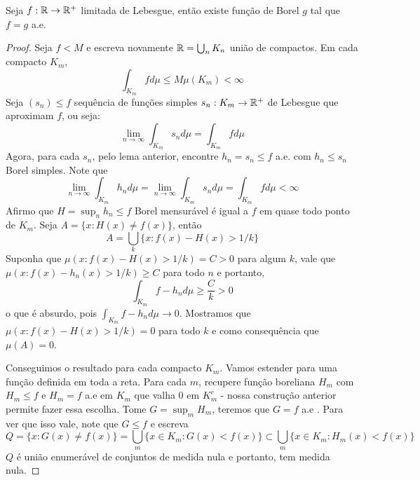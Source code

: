 \begin{lemma}
    Seja $f : \mathbb{R} \rightarrow \mathbb{R}^+$ limitada de Lebesgue, então existe função de Borel $g$ tal que 
    $f = g$ a.e.
\end{lemma}
\begin{proof}
    Seja $f < M$ e escreva novamente $\mathbb{R} = \bigcup_n K_n$ união de compactos. Em cada compacto $K_m$,
    $$\int_{K_m} fd\mu \leq M\mu(K_m) < \infty$$
    Seja $(s_n) \leq f$ sequência de funções simples $s_n : K_m \rightarrow \mathbb{R}^+$ de Lebesgue que aproximam $f$, ou seja:
    $$\lim_{n\to\infty} \int_{K_m} s_n d\mu = \int_{K_m} f d\mu$$
    Agora, para cada $s_n$, pelo lema anterior, encontre $h_n = s_n \leq f$ a.e. com $h_n \leq s_n$ Borel simples. Note que
    $$\lim_{n\to\infty}\int_{K_m} h_n d\mu = \lim_{n\to\infty} \int_{K_m} s_n d\mu = \int_{K_m} fd\mu < \infty$$
    Afirmo que $H = \sup_n h_n \leq f$ Borel mensurável é igual a $f$ em quase todo ponto de $K_m$. Seja $A = \{x : H(x) \neq f(x)\}$, então
    $$A = \bigcup_k \{x: f(x) - H(x) > 1/k\}$$
    Suponha que $\mu(x : f(x) - H(x) > 1/k) = C > 0$ para algum $k$, vale que $\mu(x: f(x) - h_n(x) > 1/k) \geq C $ para todo $n$ e 
    portanto,
    $$\int_{K_m} f - h_n d\mu \geq \frac{C}{k} > 0$$
    o que é absurdo, pois $\int_{K_m} f - h_nd\mu \to 0$. Mostramos que  $\mu(x : f(x) - H(x) > 1/k) = 0$ para todo $k$ e 
    como consequência que $\mu(A) = 0$.

    Conseguimos o resultado para cada compacto $K_m$. Vamos estender para uma função definida em toda a reta.
    Para cada $m$, recupere função boreliana $H_m$ com $H_m \leq f$ e $H_m = f$ a.e em $K_m$ que valha $0$ em $K_m^c$ - nossa construção
    anterior permite fazer essa escolha. Tome $G = \sup_m H_m$, teremos que $G = f$ a.e . Para ver que isso vale, note que
    $G \leq f$ e escreva
    $$Q = \{x : G(x) \neq f(x)\} = \bigcup_m \{x \in K_m : G(x) < f(x)\} \subset \bigcup_m \{x \in K_m : H_m(x) < f(x)\}$$
    $Q$ é união enumerável de conjuntos de medida nula e portanto, tem medida nula.
\end{proof}

